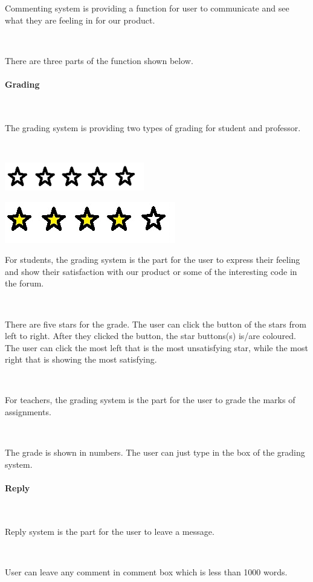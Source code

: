 Commenting system is providing a function for user to communicate and see what they are feeling in for our product.\par~

There are three parts of the function shown below.

\paragraph{Grading}~

The grading system is providing two types of grading for student and professor.\par~

\includegraphics[scale=0.7]{Doc/Graphics/0star}

\includegraphics[scale=0.56]{Doc/Graphics/4star}

For students, the grading system is the part for the user to express their feeling and show their satisfaction with our product or some of the interesting code in the forum.\par~

There are five stars for the grade. The user can click the button of the stars from left to right. After they clicked the button, the star buttons(s) is/are coloured. The user can click the most left that is the most unsatisfying star, while the most right that is showing the most satisfying.\par~

For teachers, the grading system is the part for the user to grade the marks of assignments.\par~

The grade is shown in numbers. The user can just type in the box of the grading system.

\paragraph{Reply}~

Reply system is the part for the user to leave a message.\par~

User can leave any comment in comment box which is less than 1000 words.\par~

